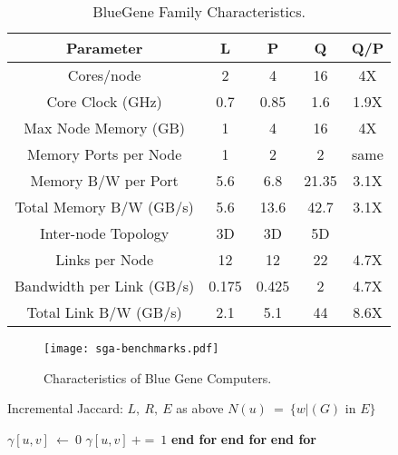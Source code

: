 \begin{table}\begin{centering}
  \centering
  \begin{tabular}{|c|c|c|c|c|}
    \hline
Parameter&L&P&Q&Q/P\\
\hline\hline
Cores/node&2&4&16&4X\\ \hline
Core Clock (GHz)&0.7&0.85&1.6&1.9X\\ \hline
Max Node Memory (GB)&1&4&16&4X\\ \hline
Memory Ports per Node&1&2&2&same\\ \hline
Memory B/W per Port&5.6&6.8&21.35&3.1X\\ \hline
Total Memory B/W (GB/s)&5.6&13.6&42.7&3.1X\\ \hline
Inter-node Topology&3D&3D&5D&\\ \hline
Links per Node&12&12&22&4.7X\\ \hline
Bandwidth per Link (GB/s)&0.175&0.425&2&4.7X\\ \hline
Total Link B/W (GB/s)&2.1&5.1&44&8.6X\\ \hline
  \end{tabular}
  \caption{BlueGene Family Characteristics.}
  \label{tab:bluegene-\myInitials}
\end{centering}\end{table}

\begin{figure}\begin{centering}
\texttt{[image: sga-benchmarks.pdf]}
\caption{Characteristics of Blue Gene Computers.}
\label{fig:xyz-\myInitials}
\end{centering}\end{figure}

\begin{algorithm}
\caption{Incremental Jaccard: 
\newline $L,~R,~E$ as above
\newline $N(u)~=~\{w|(G)$ in $E\}$}
\label{alg:J2}
\begin{algorithmic}[1]
    	    \State $\gamma[u,v]~\gets~0$
    	            \State $\gamma[u,v]~+=~1$
    	        \EndIf
    	    \EndFor
    	    \State \textbf{end for}
		\EndFor
		\State \textbf{end for}
	\EndFor
	\State \textbf{end for}
	\EndProcedure
\end{algorithmic}
\end{algorithm}

